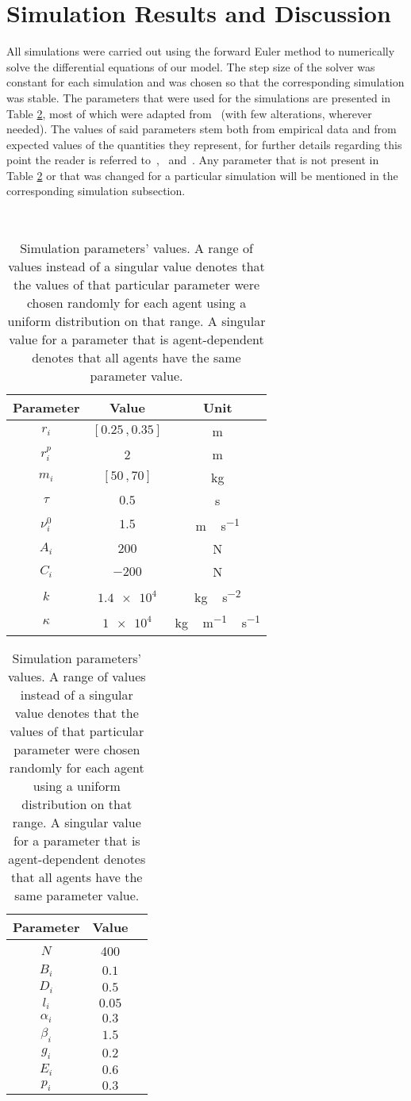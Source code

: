 \section{Simulation Results and Discussion}
All simulations were carried out using the forward Euler method to numerically solve the differential equations of our model. The step size of the solver was constant for each simulation and was chosen so that the corresponding simulation was stable. The parameters that were used for the simulations are presented in Table \ref{tab:param}, most of which were adapted from~\citet{Wang2016} (with few alterations, wherever needed). The values of said parameters stem both from empirical data and from expected values of the quantities they represent, for further details regarding this point the reader is referred to~\citet{Helbing2000},~\citet{Zainuddin2010} and~\citet{Wang2016}. Any parameter that is not present in Table \ref{tab:param} or that was changed for a particular simulation will be mentioned in the corresponding simulation subsection.

\begin{table}[ht]
	\, \hfill
	\begin{tabular}{c c c}
		\hline
		Parameter & Value & Unit \\ \hline
		$r_i$ & $[0.25 \,, 0.35]$ & \si{\meter} \\
		$r_i^p$ & 2 & \si{\meter} \\
		$m_i$ & $[50 \,, 70]$ & \si{\kilogram} \\
		$\tau$ & $0.5$ & \si{\second} \\
		$\nu_i^0$ & $1.5$ & \si{\meter\,\second^{-1}} \\
		$A_i$ & $200$ & \si{\newton} \\
		$C_i$ & $-200$ & \si{\newton} \\
		$k$ & $\num{1.4e4}$ & \si{\kilogram\,\second^{-2}} \\
		$\kappa$ & $\num{1e4}$ & \si{\kilogram\,\meter^{-1}\,\second^{-1}} \\
	\end{tabular}
	\hfill
	\begin{tabular}{c c c}
		\hline
		Parameter & Value & \\ \hline
		$N$ & 400 & \\
		$B_i$ & $0.1$ &  \\
		$D_i$ & $0.5$ &  \\
		$l_i$ & $0.05$ &  \\
		$\alpha_i$ & $0.3$ &  \\
		$\beta_i$ & $1.5$ &  \\
		$g_i$ & $0.2$ &  \\
		$E_i$ & $0.6$ &  \\
		$p_i$ & $0.3$ &  \\
	\end{tabular}
	\hfill \,
	\caption{Simulation parameters' values. A range of values instead of a singular value denotes that the values of that particular parameter were chosen randomly for each agent using a uniform distribution on that range. A singular value for a parameter that is agent-dependent denotes that all agents have the same parameter value.}
	\label{tab:param}
\end{table}


